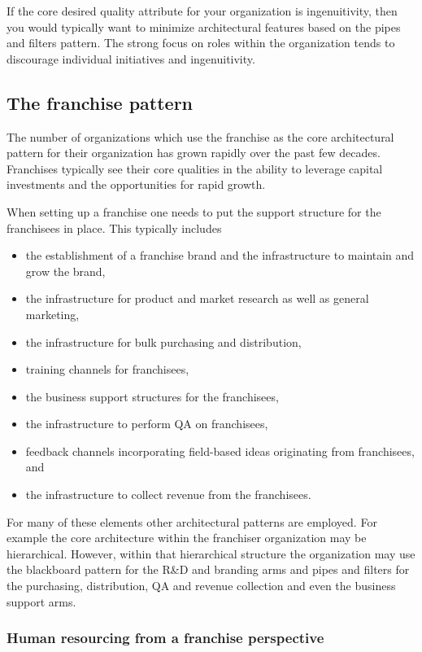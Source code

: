 \documentclass[11pt,english,a4]{article}
\begin{document}
If the core desired quality attribute for your organization is ingenuitivity, then you would typically want to minimize architectural features based on the pipes and filters pattern. The strong focus on roles within the organization tends to discourage individual initiatives and ingenuitivity.

\subsection{The franchise pattern}

The number of organizations which use the franchise as the core architectural pattern for their organization has grown rapidly over the past few decades. Franchises typically see their core qualities in the ability to leverage capital investments and the opportunities for rapid growth.

When setting up a franchise one needs to put the support structure for the franchisees in place. This typically includes 
\begin{itemize}
  \item the establishment of a franchise brand and the infrastructure to maintain and grow the brand,
  \item the infrastructure for product and market research as well as general marketing,
  \item the infrastructure for bulk purchasing and distribution,
  \item training channels for franchisees,
  \item the business support structures for the franchisees,
  \item the infrastructure to perform QA on franchisees,
  \item feedback channels incorporating field-based ideas originating from franchisees, and
  \item the infrastructure to collect revenue from the franchisees.
\end{itemize}
\noindent 
For many of these elements other architectural patterns are employed. For example the core architecture within the franchiser organization may be hierarchical. However, within that hierarchical structure the organization may use the blackboard pattern for the R\&D and branding arms and pipes and filters for the purchasing, distribution, QA and revenue collection and even the business support arms.

\subsubsection{Human resourcing from a franchise perspective}
\end{document}
